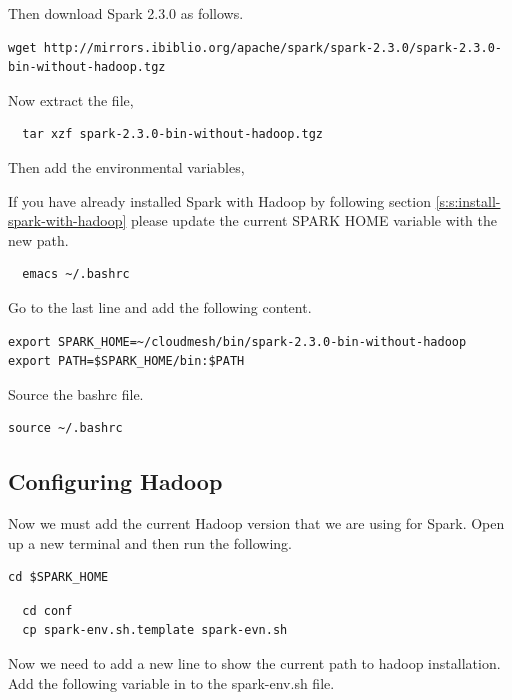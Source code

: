 Then download Spark 2.3.0 as follows. 

\begin{lstlisting}
wget http://mirrors.ibiblio.org/apache/spark/spark-2.3.0/spark-2.3.0-bin-without-hadoop.tgz
\end{lstlisting}

Now extract the file,

\begin{lstlisting}
  tar xzf spark-2.3.0-bin-without-hadoop.tgz  
\end{lstlisting}

Then add the environmental variables,

\begin{NOTE}
  If you have already installed Spark with Hadoop by following section
  \ref{s:s:install-spark-with-hadoop} please update the current SPARK
  HOME variable with the new path.
\end{NOTE}

\begin{lstlisting}
  emacs ~/.bashrc  
\end{lstlisting}

Go to the last line and add the following content.

\begin{lstlisting}
export SPARK_HOME=~/cloudmesh/bin/spark-2.3.0-bin-without-hadoop
export PATH=$SPARK_HOME/bin:$PATH
\end{lstlisting}  

Source the bashrc file.

\begin{lstlisting}
source ~/.bashrc
\end{lstlisting}

\subsection{Configuring Hadoop}

Now we must add the current Hadoop version that we are using for
Spark. Open up a new terminal and then run the following.

\begin{lstlisting}
cd $SPARK_HOME
\end{lstlisting}

\begin{lstlisting}
  cd conf
  cp spark-env.sh.template spark-evn.sh
\end{lstlisting}

Now we need to add a new line to show the current path to
hadoop installation. Add the following variable in to the
spark-env.sh file.

